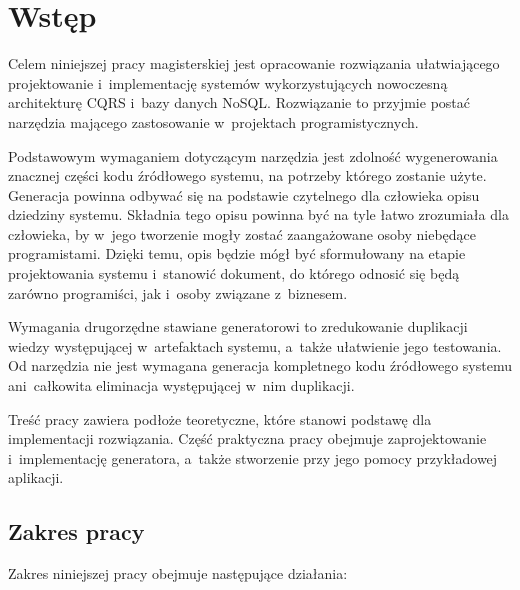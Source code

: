 \chapter{Wstęp} \label{chap:intro}

Celem niniejszej pracy magisterskiej jest opracowanie rozwiązania ułatwiającego projektowanie i~implementację systemów wykorzystujących nowoczesną architekturę CQRS i~bazy danych NoSQL.
Rozwiązanie to przyjmie postać narzędzia mającego zastosowanie w~projektach programistycznych.

Podstawowym wymaganiem dotyczącym narzędzia jest zdolność wygenerowania znacznej części kodu źródłowego systemu, na potrzeby którego zostanie użyte.
Generacja powinna odbywać się na podstawie czytelnego dla człowieka opisu dziedziny systemu.
Składnia tego opisu powinna być na tyle łatwo zrozumiała dla człowieka, by w~jego tworzenie mogły zostać zaangażowane osoby niebędące programistami.
Dzięki temu, opis będzie mógł być sformułowany na etapie projektowania systemu i~stanowić dokument, do którego odnosić się będą zarówno programiści, jak i~osoby związane z~biznesem.

Wymagania drugorzędne stawiane generatorowi to zredukowanie duplikacji wiedzy występującej w~artefaktach systemu, a~także ułatwienie jego testowania.
Od narzędzia nie jest wymagana generacja kompletnego kodu źródłowego systemu ani~całkowita eliminacja występującej w~nim duplikacji.

Treść pracy zawiera podłoże teoretyczne, które stanowi podstawę dla implementacji rozwiązania.
Część praktyczna pracy obejmuje zaprojektowanie i~implementację generatora, a~także stworzenie przy jego pomocy przykładowej aplikacji.



\section{Zakres pracy} \label{sec:intro:scope}

Zakres niniejszej pracy obejmuje następujące działania:

